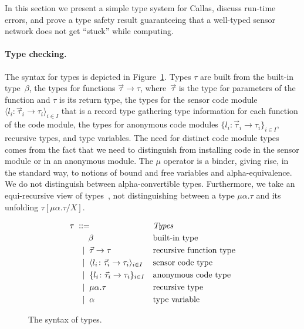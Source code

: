 \documentclass[copyright,creativecommons]{eptcs}
\def\obj#1{\{#1\}}
\def\typeamodd{\obj {l_i \colon \vec \tau_i \rightarrow \tau_i}_{i \in I}}
\def\typesmodd{\anyObj {l_i \colon \vec \tau_i \rightarrow \tau_i}_{i \in I}}
\def\anyObj#1{\langle {#1} \rangle}
\newcommand{\recType}[2]{\mu {#1}.{#2}}
\newcommand{\recTyped}{\recType{\alpha} {\tau}}
\newcommand{\subs}[2]{[{#1}/{#2}]}
\newcommand{\arrowType}[2]{{#1} \rightarrow {#2}}
\newcommand{\arrowTyped}{\arrowType {\vec \tau} {\tau}}
\newcommand{\pad}{\;\;}
\newcommand{\Space}[1]{\pad{#1}\pad}
\newcommand{\grmeq}{\Space{::=}}
\newcommand{\grmor}{\;\mid\;}
\begin{document}
In this section we present a simple type system for Callas, discuss
run-time errors, and prove a type safety result guaranteeing that a
well-typed sensor network does not get ``stuck'' while computing.

\paragraph{Type checking.}
\label{sec:type-checking}
The syntax for types is depicted in Figure~\ref{fig:syntax-types}.
Types $\tau$ are built from the built-in type~$\beta$, the types 
for functions $\arrowTyped$, where~$\vec \tau$ is
the type for parameters of the function and $\tau$ is its return
type, the types for the sensor code module $\typesmodd$ that is a record
type gathering type information for each function of the code module,
the types for anonymous code modules $\typeamodd$, recursive types,
and type variables. The need for distinct code module types comes from
the fact that we need to distinguish from installing code in the sensor module 
or in an anonymous module.
The $\mu$ operator is a binder, giving rise, in the standard way, to
notions of bound and free variables and alpha-equivalence. We do not
distinguish between alpha-convertible types.  Furthermore, we take an
equi-recursive view of
types~\cite{pierce:types-programming-languages}, not distinguishing
between a type $\recTyped$ and its unfolding $\tau\subs\recTyped X$.





\begin{figure}
\begin{align*}
  & \tau \grmeq & & \text{\emph{Types}}
  \\
  & \qquad \; \beta & & \text{built-in type}
  \\
  & \quad \grmor \arrowTyped & & \text{recursive function type}
  \\
  & \quad \grmor   \typesmodd & & \text{sensor code type}
  \\
  & \quad \grmor   \typeamodd & & \text{anonymous code type}
  \\
  & \quad \grmor   \recTyped & & \text{recursive type}
  \\
  & \quad \grmor   \alpha & & \text{type variable}
\end{align*}
\caption{The syntax of types.}
\label{fig:syntax-types}
\end{figure}
\end{document}
